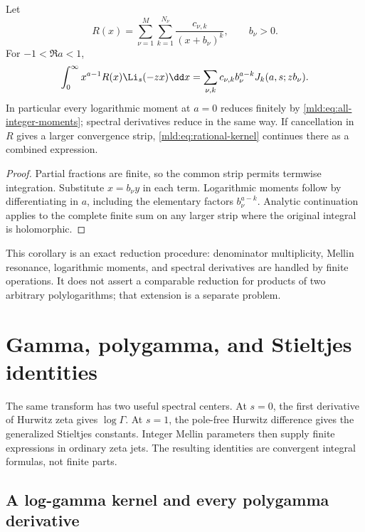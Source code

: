 \begin{corollary}\label{mld:cor:rational-kernel}
Let
\[
 R(x)=\sum_{\nu=1}^{M}\sum_{k=1}^{N_\nu}
                        \frac{c_{\nu,k}}{(x+b_\nu)^k},\qquad b_\nu>0.
\]
For $-1<\Re a<1$,
\begin{equation}\label{mld:eq:rational-kernel}
 \int_0^\infty x^{a-1}R(x)\Li_s(-zx)\dd x
       =\sum_{\nu,k}c_{\nu,k}b_\nu^{a-k}
                          J_k(a,s;zb_\nu).
\end{equation}
In particular every logarithmic moment at $a=0$ reduces finitely by \eqref{mld:eq:all-integer-moments}; spectral derivatives reduce in the same way. If cancellation in $R$ gives a larger convergence strip, \eqref{mld:eq:rational-kernel} continues there as a combined expression.
\end{corollary}
\begin{proof}
Partial fractions are finite, so the common strip permits termwise integration. Substitute $x=b_\nu y$ in each term. Logarithmic moments follow by differentiating in $a$, including the elementary factors $b_\nu^{a-k}$. Analytic continuation applies to the complete finite sum on any larger strip where the original integral is holomorphic.
\end{proof}

This corollary is an exact reduction procedure: denominator multiplicity, Mellin resonance, logarithmic moments, and spectral derivatives are handled by finite operations. It does not assert a comparable reduction for products of two arbitrary polylogarithms; that extension is a separate problem.


\section{Gamma, polygamma, and Stieltjes identities}\label{mld:sec:jets}

The same transform has two useful spectral centers. At $s=0$, the first derivative of Hurwitz zeta gives $\log\Gamma$. At $s=1$, the pole-free Hurwitz difference gives the generalized Stieltjes constants. Integer Mellin parameters then supply finite expressions in ordinary zeta jets. The resulting identities are convergent integral formulas, not finite parts.

\subsection{A log-gamma kernel and every polygamma derivative}

